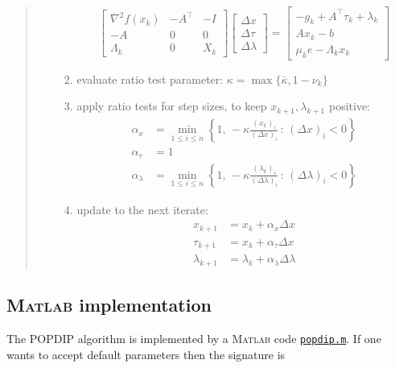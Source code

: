 \documentclass[11pt]{article}
\newcommand{\grad}{\nabla}
\newcommand{\Matlab}{\textsc{Matlab}\xspace}
\begin{document}
\begin{quote}
\begin{itemize}
\begin{enumerate}
    $$\begin{bmatrix}
\grad^2 f(x_k) & -A^\top & -I \\
-A             & 0       & 0  \\
\Lambda_k      & 0       & X_k
\end{bmatrix}
\begin{bmatrix}
\Delta x \\
\Delta \tau \\
\Delta \lambda
\end{bmatrix}
=
\begin{bmatrix}
-g_k + A^\top \tau_k + \lambda_k \\
A x_k - b \\
\mu_k e - \Lambda_k x_k
\end{bmatrix}$$
    \item evaluate ratio test parameter: $\kappa = \max\{\bar\kappa,1-\nu_k\}$
    \item apply ratio tests for step sizes, to keep $x_{k+1},\lambda_{k+1}$ positive:
\begin{align*}
\alpha_x &= \min_{1\le i\le n} \left\{1, \,-\kappa \frac{(x_k)_i}{(\Delta x)_i} \,:\, (\Delta x)_i < 0\right\} \\
\alpha_\tau &= 1 \\
\alpha_\lambda &= \min_{1\le i\le n} \left\{1, \,-\kappa \frac{(\lambda_k)_i}{(\Delta \lambda)_i} \,:\, (\Delta \lambda)_i < 0\right\}
\end{align*}
    \item update to the next iterate:
\begin{align*}
x_{k+1} &= x_k + \alpha_x \Delta x \\
\tau_{k+1} &= x_k + \alpha_\tau \Delta x \\
\lambda_{k+1} &= \lambda_k + \alpha_\lambda \Delta \lambda
\end{align*}
    \end{enumerate}
\end{itemize}
\end{quote}



\subsection*{\Matlab implementation}

The POPDIP algorithm is implemented by a \Matlab code \href{https://github.com/bueler/popdip/blob/main/matlab/popdip.m}{\texttt{popdip.m}}.  If one wants to accept default parameters then the signature is
\end{document}
